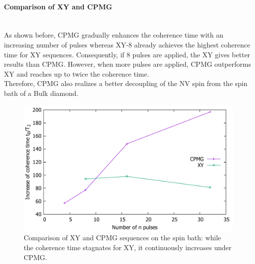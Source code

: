 \documentclass[12pt,a4paper]{article}
\begin{document}
\paragraph{Comparison of XY and CPMG}\mbox{}\\
As shown before, CPMG gradually enhances the coherence time with an increasing number of pulses whereas XY-8 already achieves the highest coherence time for XY sequences. Consequently, if 8 pulses are applied, the XY gives better results than CPMG. However, when more pulses are applied, CPMG outperforms XY and reaches up to twice the coherence time. \\
Therefore, CPMG also realizes a better decoupling of the NV spin from the spin bath of a Bulk diamond.
\begin{figure}[H]
\centering
\includegraphics[scale=0.6]{bulkcx2.pdf} 
\caption{Comparison of XY and CPMG sequences on the spin bath: while the coherence time stagnates for XY, it continuously increases under CPMG.}
\label{xcb}
\end{figure}
\end{document}
